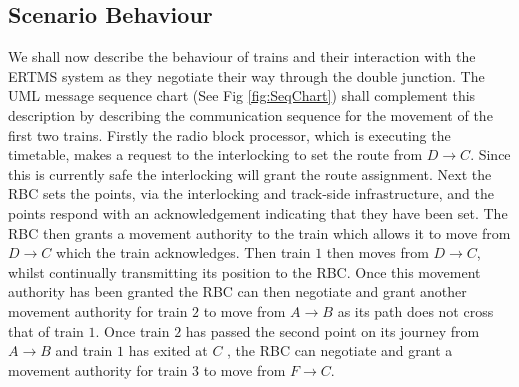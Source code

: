 \subsection*{Scenario Behaviour}
We shall now describe the behaviour of trains and their interaction with the ERTMS system as they negotiate their way through the double junction. The UML message sequence chart (See Fig \ref{fig:SeqChart}) shall complement this description by describing the communication sequence for the movement of the first two trains. Firstly the radio block processor, which is executing the timetable, makes a request to the interlocking to set the route from $D \to C$. Since this is currently safe the interlocking will grant the route assignment. Next the RBC sets the points, via the interlocking and track-side infrastructure, and the points respond with an acknowledgement indicating that they have been set. The RBC then grants a movement authority to the train which allows it to move from $D \to C$ which the train acknowledges. Then train $1$ then moves from $D \to C$, whilst continually transmitting its position to the RBC. Once this movement authority has been granted the RBC can then negotiate and grant another movement authority for train $2$ to move from $A \to B$ as its path does not cross that of train $1$. Once train $2$ has passed the second point on its journey  from $A \to B$ and train $1$ has exited at $C$ , the RBC can negotiate and grant a movement authority for train $3$ to move from $F \to C$.
